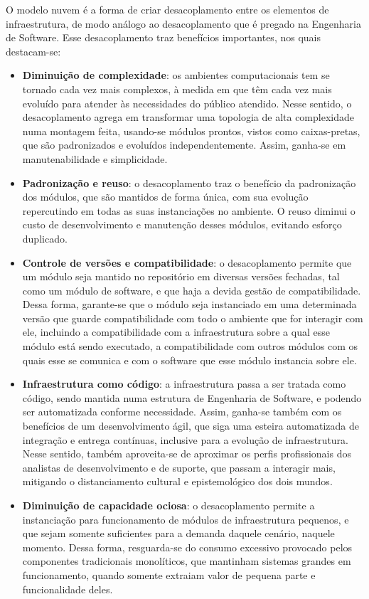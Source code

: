     O modelo nuvem é a forma de criar desacoplamento entre os elementos de infraestrutura, de modo análogo ao desacoplamento que é pregado na Engenharia de Software. Esse desacoplamento traz benefícios importantes, nos quais destacam-se:
    \begin{itemize}
        \item \textbf{Diminuição de complexidade}: os ambientes computacionais tem se tornado cada vez mais complexos, à medida em que têm cada vez mais evoluído para atender às necessidades do público atendido. Nesse sentido, o desacoplamento agrega em transformar uma topologia de alta complexidade numa montagem feita, usando-se módulos prontos, vistos como caixas-pretas, que são padronizados e evoluídos independentemente. Assim, ganha-se em manutenabilidade e simplicidade.
        \item \textbf{Padronização e reuso}: o desacoplamento traz o benefício da padronização dos módulos, que são mantidos de forma única, com sua evolução repercutindo em todas as suas instanciações no ambiente. O reuso diminui o custo de desenvolvimento e manutenção desses módulos, evitando esforço duplicado.
        \item \textbf{Controle de versões e compatibilidade}: o desacoplamento permite que um módulo seja mantido no repositório em diversas versões fechadas, tal como um módulo de software, e que haja a devida gestão de compatibilidade. Dessa forma, garante-se que o módulo seja instanciado em uma determinada versão que guarde compatibilidade com todo o ambiente que for interagir com ele, incluindo a compatibilidade com a infraestrutura sobre a qual esse módulo está sendo executado, a compatibilidade com outros módulos com os quais esse se comunica e com o software que esse módulo instancia sobre ele.
        \item \textbf{Infraestrutura como código}: a infraestrutura passa a ser tratada como código, sendo mantida numa estrutura de Engenharia de Software, e podendo ser automatizada conforme necessidade. Assim, ganha-se também com os benefícios de um desenvolvimento ágil, que siga uma esteira automatizada de integração e entrega contínuas, inclusive para a evolução de infraestrutura. Nesse sentido, também aproveita-se de aproximar os perfis profissionais dos analistas de desenvolvimento e de suporte, que passam a interagir mais, mitigando o distanciamento cultural e epistemológico dos dois mundos.
        \item \textbf{Diminuição de capacidade ociosa}: o desacoplamento permite a instanciação para funcionamento de módulos de infraestrutura pequenos, e que sejam somente suficientes para a demanda daquele cenário, naquele momento. Dessa forma, resguarda-se do consumo excessivo provocado pelos componentes tradicionais monolíticos, que mantinham sistemas grandes em funcionamento, quando somente extraiam valor de pequena parte e funcionalidade deles.

\end{itemize}
